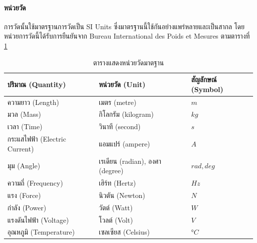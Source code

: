 \paragraph*{หน่วยวัด}
การวัดนั้นใช้มาตรฐานการวัดเป็น SI Units ซึ่งมาตรฐานนี้ใช้กันอย่างแพร่หลายและเป็นสากล โดยหน่วยการวัดนี้ได้รับการยืนยันจาก
Bureau International des Poids et Mesures ตามตารางที่ \ref{tab:standart_unit}

\begin{table}[!ht]
	\centering
	\begin{tabular}{| l | l | l |}
		\hline
		ปริมาณ (Quantity)                     & หน่วยวัด (Unit)                      & สัญลักษณ์ (Symbol) \\
		\hline
		ความยาว (Length)                    & เมตร (metre)                                 & $m$                                 \\
		มวล (Mass)                                  & กิโลกรัม (kilogram)                  & $kg$                                \\
		เวลา (Time)                               & วินาที (second)                          & $s$                                 \\
		กระแสไฟฟ้า (Electric Current) & แอมแปร์ (ampere)                       & $A$                                 \\
		มุม (Angle)                                 & เรเดียน (radian), องศา (degree) & $rad, deg$                          \\
		ความถี่ (Frequency)                 & เฮิร์ท (Hertz)                           & $Hz$                                \\
		แรง (Force)                                 & นิวตัน (Newton)                          & $N$                                 \\
		กำลัง (Power)                           & วัตต์ (Watt)                               & $W$                                 \\
		แรงดันไฟฟ้า (Voltage)       & โวลต์ (Volt)                               & $V$                                 \\
		อุณหภูมิ (Temperature)            & เซลเซียส (Celsius)                   & $°C$                                 \\
		\hline
	\end{tabular}
	\caption{ตารางแสดงหน่วยวัดมาตฐาน}
	\label{tab:standart_unit}
\end{table}

